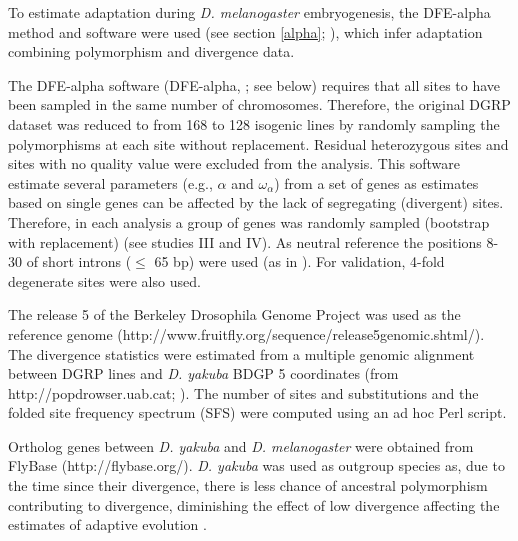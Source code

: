 
To estimate adaptation during \textit{D. melanogaster} embryogenesis, the DFE-alpha method and software were used (see section \ref{alpha}; \citealp{Eyre-Walker2009}), which infer adaptation combining polymorphism and divergence data.

The DFE-alpha software (DFE-alpha, \citealp{Eyre-Walker2009}; see below) requires that all sites to have been sampled in the same number of chromosomes. Therefore, the original DGRP dataset was reduced to from 168 to 128 isogenic lines by randomly sampling the polymorphisms at each site without replacement. Residual heterozygous sites and sites with no quality value were excluded from the analysis.
%
This software estimate several parameters (e.g., $\alpha$ and $\omega_{\alpha}$) from a set of genes as estimates based on single genes can be affected by the lack of segregating (divergent) sites. Therefore, in each analysis a group of genes was randomly sampled (bootstrap with replacement) (see studies III and IV). 
As neutral reference the positions 8-30 of short introns ($\leq$ 65 bp) were used (as in \citealp{Heyn2014}). For validation, 4-fold degenerate sites were also used.

The release 5 of the Berkeley Drosophila Genome Project was used as the reference genome (http://www.fruitfly.org/sequence/release5genomic.shtml/). The divergence statistics were estimated from a multiple genomic alignment between DGRP lines and \textit{D. yakuba} BDGP 5 coordinates (from http://popdrowser.uab.cat; \citealp{Ramia2012}).
The number of sites and substitutions and the folded site frequency spectrum (SFS) were computed using an ad hoc Perl script.

Ortholog genes between \textit{D. yakuba} and \textit{D. melanogaster} were obtained from FlyBase (http://flybase.org/). \textit{D. yakuba} was used as outgroup species as, due to the time since their divergence, there is less chance of ancestral polymorphism contributing to divergence, diminishing the effect of low divergence affecting the estimates of adaptive evolution \citep{Keightley2012}.